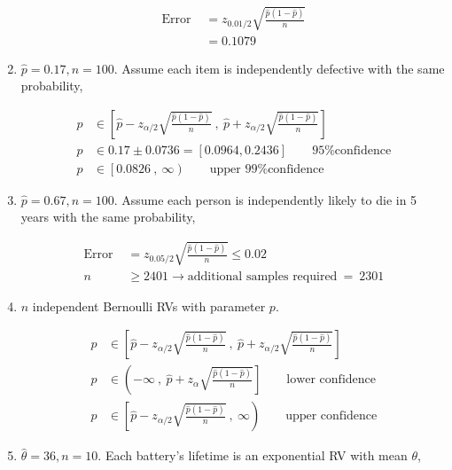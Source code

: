 \begin{enumerate}
		\begin{align}
			\text{Error } &= z_{0.01/2}\sqrt{\frac{\widehat{p}(1-\widehat{p})}{n}} \nonumber \\
			&= 0.1079
		\end{align}
	
	
	\item $ \widehat{p}  = 0.17, n = 100$. Assume each item is independently defective with the same probability,
	
		\begin{align}
			p &\in \left[ \widehat{p} - z_{\alpha/2}\sqrt{\frac{\widehat{p}(1-\widehat{p})}{n}}\ ,\ \widehat{p} + z_{\alpha/2}\sqrt{\frac{\widehat{p}(1-\widehat{p})}{n}}  \right] \nonumber \\
			p &\in 0.17 \pm 0.0736 = [0.0964, 0.2436] \qquad \text{95\% confidence} \\
			p &\in \left[0.0826\ ,\ \infty \right) \qquad \text{upper 99\% confidence} 
		\end{align}
	
	
	\item $ \widehat{p}  = 0.67, n = 100$. Assume each person is independently likely to die in 5 years with the same probability,
	
		\begin{align}
			\text{Error } &= z_{0.05/2}\sqrt{\frac{\widehat{p}(1-\widehat{p})}{n}} \leq 0.02 \nonumber \\
			n &\geq 2401 \to \text{additional samples required}\ =\ 2301
		\end{align}
	
	
	\item $ n $ independent Bernoulli RVs with parameter $ p $.
	
	
		\begin{align}
			p &\in \left[ \widehat{p} - z_{\alpha/2}\sqrt{\frac{\widehat{p}(1-\widehat{p})}{n}}\ ,\ \widehat{p} + z_{\alpha/2}\sqrt{\frac{\widehat{p}(1-\widehat{p})}{n}}  \right] \\
			p &\in \left( -\infty\ ,\ \widehat{p} + z_{\alpha}\sqrt{\frac{\widehat{p}(1-\widehat{p})}{n}}  \right] \qquad \text{lower confidence}\\
			p &\in \left[ \widehat{p} - z_{\alpha/2}\sqrt{\frac{\widehat{p}(1-\widehat{p})}{n}}\ ,\ \infty  \right) \qquad \text{upper confidence}
		\end{align}
	
	
	\item $ \widehat{\theta}  = 36, n = 10$. Each battery's lifetime is an exponential RV with mean $ \theta $,
	

\end{enumerate}
